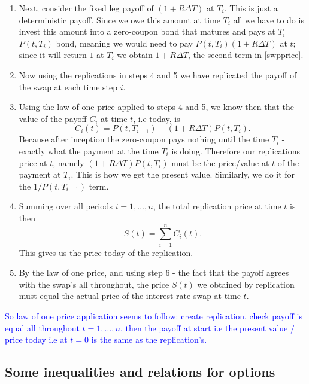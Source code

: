\documentclass[9pt]{extarticle}
\begin{document}
\begin{enumerate}
  \item Next, consider the fixed leg payoff of $(1+R\Delta T)$ at $T_i$.  
  This is just a deterministic payoff. Since we owe this amount at time $T_i$ all 
  we have to do is invest this amount into a zero-coupon bond that matures and pays at $T_i$ 
  $P(t,T_{i})$ bond, meaning we would need to pay $P(t,T_i)(1+R\Delta T)$ at $t$; since it will return $1$ at $T_{i}$ we obtain $1+R\Delta T$, the second term in \eqref{swpprice}.
  \item Now using the replications in steps 4 and 5 we have replicated the payoff of the swap at each time step $i$. 
  \item Using the law of one price applied to steps 4 and 5, we know then that the value of the payoff $C_i$ at time $t$, i.e today, is 
  \[
    C_i(t) = P(t,T_{i-1}) - (1+R\Delta T) P(t,T_i).
  \]
  Because after inception the zero-coupon pays nothing until the time $T_i$ - exactly what the payment at the time $T_i$ is doing. Therefore our 
  replications price at $t$, namely $(1+R\Delta T)P(t,T_i)$ must be the price/value at $t$ of the payment at $T_i$. This is how we get the present value. 
  Similarly, we do it for the $1/P(t,T_{i-1})$ term. 
  \item Summing over all periods $i=1,\dots,n$, the total replication price at time $t$ is then 
  \[
    S(t) = \sum_{i=1}^n C_i(t).
  \]
  This gives us the price today of the replication.
  \item By the law of one price, and using step 6 - the fact that the payoff agrees with the swap's all throughout, 
  the price $S(t)$ we obtained by replication must equal the actual price of the interest rate swap at time $t$.
\end{enumerate}

\textcolor{blue}{So law of one price application seems to follow: create replication, check payoff is equal all throughout $t=1,\ldots,n$, then the payoff at start i.e the present value / price 
today i.e at $t=0$ is the same as the replication's.}

\subsection{Some inequalities and relations for options}
\end{document}

